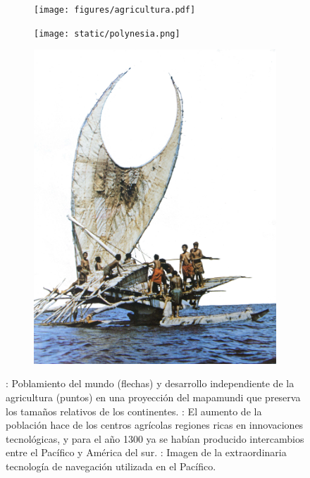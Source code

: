 \documentclass[a4paper,11pt]{book}
\theoremstyle{definition}
\begin{document}
\begin{figure}[ht!]
\centering
 \begin{subfigure}[b]{0.145\textwidth} \centering
  \texttt{[image: figures/agricultura.pdf]}
  \caption{}
  \label{fig:poblamiento}
  \end{subfigure}
 \begin{subfigure}[b]{0.45\textwidth} \centering
  \texttt{[image: static/polynesia.png]}
  \caption{}
  \label{fig:pacifico}
  \end{subfigure}
 \begin{subfigure}[b]{0.24\textwidth} \centering
  \includegraphics[width=\linewidth]{static/tonga_barco.jpg}
  \caption{}
  \label{fig:tecnologia}
  \end{subfigure}
 \caption{
: Poblamiento del mundo (flechas) y desarrollo independiente de la agricultura (puntos) en una proyecci\'on del mapamundi que preserva los tama\~nos relativos de los continentes. : El aumento de la poblaci\'on hace de los centros agr\'icolas regiones ricas en innovaciones tecnol\'ogicas, y para el a\~no 1300 ya se hab\'ian producido intercambios entre el Pac\'ifico y Am\'erica del sur.
: Imagen de la extraordinaria tecnolog\'ia de navegaci\'on utilizada en el Pac\'ifico.
 }
 \end{figure}
\end{document}
